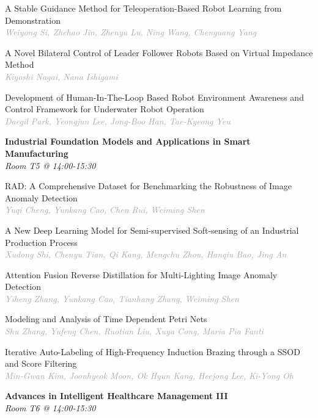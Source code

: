 \begin{multicols*}{2}
\small A Stable Guidance Method for Teleoperation-Based Robot Learning from Demonstration\\ 
\footnotesize \textcolor{darkgray}{\textit{Weiyong Si, Zhehao  Jin, Zhenyu  Lu, Ning  Wang, Chenguang  Yang}}

\small A Novel Bilateral Control of Leader Follower Robots Based on Virtual Impedance Method\\ 
\footnotesize \textcolor{darkgray}{\textit{Kiyoshi Nagai, Nana  Ishigami}}

\small Development of Human-In-The-Loop Based Robot Environment Awareness and Control Framework for Underwater Robot Operation\\ 
\footnotesize \textcolor{darkgray}{\textit{Daegil Park, Yeongjun  Lee, Jong-Boo  Han, Tae-Kyeong  Yeu}}

\normalsize \textbf{Industrial Foundation Models and Applications in Smart Manufacturing}\\
\small \textit{Room T5 @ 14:00-15:30}

\small RAD: A Comprehensive Dataset for Benchmarking the Robustness of Image Anomaly Detection\\ 
\footnotesize \textcolor{darkgray}{\textit{Yuqi Cheng, Yunkang  Cao, Chen  Rui, Weiming  Shen}}

\small A New Deep Learning Model for Semi-supervised Soft-sensing of an Industrial Production Process\\ 
\footnotesize \textcolor{darkgray}{\textit{Xudong Shi, Chenyu  Tian, Qi  Kang, Mengchu  Zhou, Hanqiu  Bao, Jing  An}}

\small Attention Fusion Reverse Distillation for Multi-Lighting Image Anomaly Detection\\ 
\footnotesize \textcolor{darkgray}{\textit{Yiheng Zhang, Yunkang  Cao, Tianhang  Zhang, Weiming  Shen}}

\small Modeling and Analysis of Time Dependent Petri Nets\\ 
\footnotesize \textcolor{darkgray}{\textit{Shu Zhang, Yufeng  Chen, Ruotian  Liu, Xuya  Cong, Maria Pia  Fanti}}

\small Iterative Auto-Labeling of High-Frequency Induction Brazing through a SSOD and Score Filtering\\ 
\footnotesize \textcolor{darkgray}{\textit{Min-Gwan Kim, Joonhyeok  Moon, Ok Hyun  Kang, Heejong  Lee, Ki-Yong  Oh}}

\normalsize \textbf{Advances in Intelligent Healthcare Management III}\\
\small \textit{Room T6 @ 14:00-15:30}


\end{multicols*}
